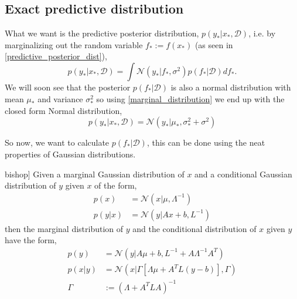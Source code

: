 \subsection{Exact predictive distribution}
What we want is the predictive posterior distribution, $p(y_*|x_*, \mathcal{D})$, i.e. by
marginalizing out the random variable $f_* := f(x_*)$ (as seen in
\eqref{predictive_posterior_dist}),
\begin{equation}\label{GP_predictive}
    p(y_*|x_*,\mathcal{D}) = \int \mathcal{N}(y_*|f_*, \sigma^2) p(f_*|\mathcal{D})df_*.
\end{equation}
We will soon see that the posterior $p(f_*|\mathcal{D})$ is also a normal distribution 
with mean $\mu_*$ and variance $\sigma^2_*$ so
using \eqref{marginal_distribution} we end up with the closed form Normal distribution, 
$$p(y_*|x_*,\mathcal{D}) = \mathcal{N}(y_*|\mu_*,\sigma^2_*+\sigma^2)$$

So now, we want to calculate $p(f_*|\mathcal{D})$, this can be done using the neat properties of Gaussian
distributions. 

\begin{testexample2}[Trick with normal distributions \cite[93]{bishop}]
    Given a marginal Gaussian distribution of $x$ and a conditional Gaussian distribution
    of $y$ given $x$ of the form, 
    \begin{align*}
        p(x) &= \mathcal{N}(x|\mu, \Lambda^{-1})\\
        p(y|x) &= \mathcal{N}(y|Ax+b, L^{-1})
    \end{align*}
    then the marginal distribution of $y$ and the conditional distribution of $x$ given $y$
    have the form, 
    \begin{align}
        p(y) &= \mathcal{N}(y|A\mu+b,L^{-1}+A \Lambda^{-1}A^T) \label{marginal_distribution}\\
        p(x|y) &= \mathcal{N}(x|\Gamma [\Lambda \mu+A^TL(y-b)],\Gamma ) \label{posterior_distribution}\\
        \Gamma &:= (\Lambda +A^TLA)^{-1} \label{Gamma}
    \end{align}
\end{testexample2}


